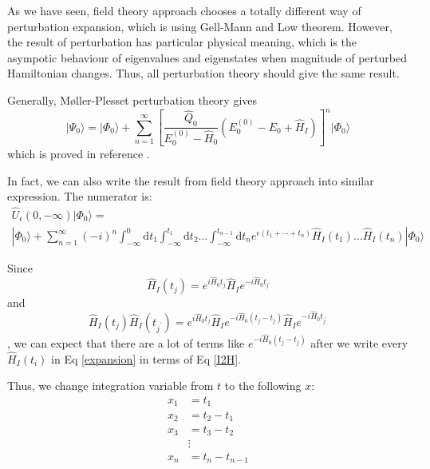 As we have seen, field theory approach chooses a totally different way of perturbation expansion, which is using Gell-Mann and Low theorem.
However, the result of perturbation has particular physical meaning, which is the asympotic behaviour of eigenvalues and eigenstates when magnitude of perturbed Hamiltonian changes.
Thus, all perturbation theory should give the same result.

Generally, M{\o}ller-Plesset perturbation theory gives
\begin{equation} \label{rspt}
| \Psi_{0} \rangle=| \Phi_{0} \rangle+\sum_{n=1}^{\infty}\left[\frac{\hat{Q}_{0}}{E_{0}^{(0)}-\hat{H}_{0}}\left(E_{0}^{(0)}-E_{0}+\hat{H}_{I}\right)\right]^{n} | \Phi_{0} \rangle
\end{equation}
which is proved in reference \cite{rsptproof}.

In fact, we can also write the result from field theory approach into similar expression.
The numerator is:
\begin{equation} \label{expansion}
\begin{array}{l}{\hat{U}_{\epsilon}(0,-\infty) | \Phi_{0} \rangle=} \\ { | \Phi_{0} \rangle+\sum_{n=1}^{\infty}(-i)^{n} \int_{-\infty}^{0} \mathrm{d} t_{1} \int_{-\infty}^{t_{1}} \mathrm{d} t_{2} \ldots \int_{-\infty}^{t_{n-1}} \mathrm{d} t_{n} e^{\epsilon\left(t_{1}+\cdots+t_{n}\right)} \hat{H}_{I}\left(t_{1}\right) \ldots \hat{H}_{I}\left(t_{n}\right) | \Phi_{0} \rangle}\end{array}
\end{equation}

Since
\begin{equation} \label{I2H}
\hat{H}_{I}\left(t_{j}\right)=e^{i \hat{H}_{0} t_{j}} \hat{H}_{I} e^{-i \hat{H}_{0} t_{j}}
\end{equation}
and 
\begin{equation}
\hat{H}_{I}\left(t_{j}\right) \hat{H}_{I}\left(t_{j^{\prime}}\right)=e^{i \hat{H}_{0} t_{j}} \hat{H}_{I} e^{-i \hat{H}_{0}\left(t_{j}-t_{j}\right)} \hat{H}_{I} e^{-i \hat{H}_{0} t_{j^{\prime}}}
\end{equation}
, we can expect that there are a lot of terms like $e^{-i \hat{H}_{0}\left(t_{j}-t_{j}\right)}$ after we write every $\hat{H}_I(t_i)$ in Eq \ref{expansion} in terms of Eq \ref{I2H}.

Thus, we change integration variable from $t$ to the following $x$:
\begin{equation}
	\begin{aligned} x_{1} &=t_{1} \\ x_{2} &=t_{2}-t_{1} \\ x_{3} &=t_{3}-t_{2} \\ & \vdots \\ x_{n} &=t_{n}-t_{n-1} \end{aligned}
\end{equation}

